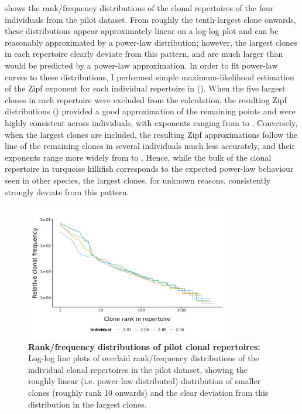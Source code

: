  shows the rank/frequency distributions of the clonal repertoires of the four individuals from the pilot dataset. From roughly the tenth-largest clone onwards, these distributions appear approximately linear on a log-log plot and can be reasonably approximated by a power-law distribution; however, the largest clones in each repertoire clearly deviate from this pattern, and are much larger than would be predicted by a power-law approximation. In order to fit power-law curves to these distributions, I performed simple maximum-likelihood estimation of the Zipf exponent for each individual repertoire in  (). When the five largest clones in each repertoire were excluded from the calculation, the resulting Zipf distributions () provided a good approximation of the remaining points and were highly consistent across individuals, with exponents ranging from  to . Conversely, when the largest clones are included, the resulting Zipf approximations follow the line of the remaining clones in several individuals much less accurately, and their exponents range more widely from  to . Hence, while the bulk of the clonal repertoire in turquoise killifish corresponds to the expected power-law behaviour seen in other species, the largest clones, for unknown reasons, consistently strongly deviate from this pattern.

\begin{figure}
\centering
\includegraphics[width=0.8\textwidth]{_Figures/png/pilot-clones-zipf-lines}
\caption[Rank/frequency distributions of pilot clonal repertoires]{\textbf{Rank/frequency distributions of pilot clonal repertoires:} Log-log line plots of overlaid rank/frequency distributions of the individual clonal repertoires in the \igseq pilot dataset, showing the roughly linear (i.e. power-law-distributed) distribution of smaller clones (roughly rank 10 onwards) and the clear deviation from this distribution in the largest clones.}
\label{fig:igseq-pilot-clones-zipf-lines}
\end{figure}

